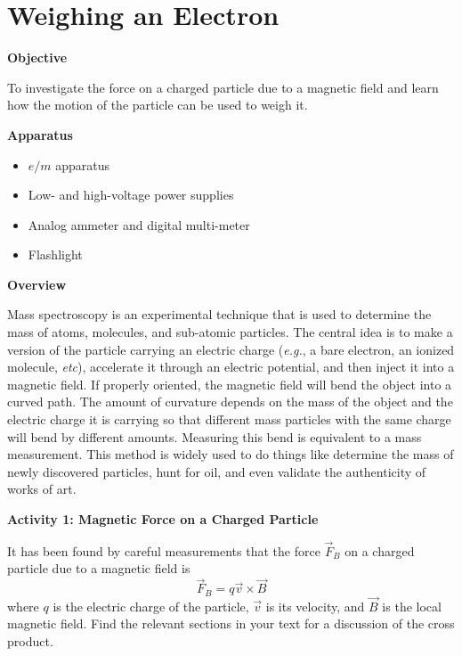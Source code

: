 \setcounter{equation}{0}
\setcounter{figure}{0}

\section{Weighing an Electron}

\makelabheader %

\bigskip
\textbf{Objective}

To investigate the force on a charged particle due to a magnetic field and 
learn how the motion of the particle can be used to weigh it.

\bigskip
\textbf{Apparatus}

\begin{itemize}[nosep]

\item $e/m$ apparatus

\item Low- and high-voltage power supplies

\item Analog ammeter and digital multi-meter

\item Flashlight

\end{itemize}

\medskip
\textbf{Overview}

Mass spectroscopy is an experimental technique that is used to determine
the mass of atoms, molecules, and sub-atomic particles.
The central idea is to make a version of the particle carrying an electric
charge ({\it e.g.}, a bare electron, an ionized molecule, {\it etc}), accelerate it
through an electric potential, and then inject it into a magnetic field.
If properly oriented, the magnetic field will bend the object into
a curved path.
The amount of curvature depends on the mass of the object and the electric
charge it is carrying so that different mass particles with the same charge will
bend by different amounts.
Measuring this bend is equivalent to a mass measurement.
This method is widely used to do things like determine the mass of newly discovered particles,
hunt for oil, and even validate the authenticity of works of art.

\bigskip
\textbf{Activity 1: Magnetic Force on a Charged Particle}

It has been found by careful measurements that the force $\vec F_B$ on a charged
particle due to a magnetic field is
\begin{equation}
\vec F_B = q \vec v \times \vec B
\end{equation}
where $q$ is the electric charge of the particle, $\vec v$ is its velocity,
and $\vec B$ is the local magnetic field.
Find the relevant sections in your text for a discussion of the cross product.

